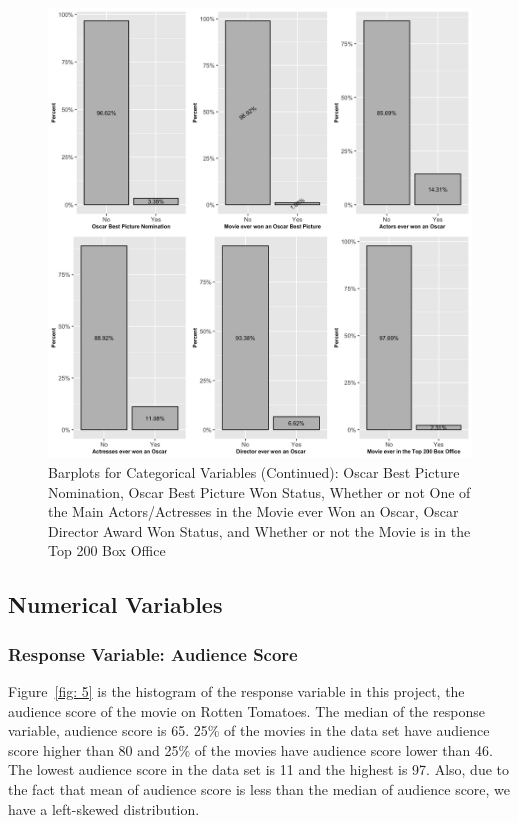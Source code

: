 \documentclass{article}
\begin{document}
\begin{figure}[htbp]
\begin{center}
\includegraphics[scale=0.25]{eda_2.png}
\caption{Barplots for Categorical Variables (Continued): Oscar Best Picture Nomination, Oscar Best Picture Won Status, Whether or not One of the Main Actors/Actresses in the Movie ever Won an Oscar, Oscar Director Award Won Status, and Whether or not the Movie is in the Top 200 Box Office}
\label{fig: 4}
\end{center}
\end{figure}

\subsection{Numerical Variables}
\smallskip
\subsubsection{Response Variable: Audience Score}
Figure~\ref{fig: 5} is the histogram of the response variable in this project, the audience 
score of the movie on Rotten Tomatoes. The median of the response variable, audience
score is 65. 25\% of the movies in the data set have audience score higher than 80 and 
25\% of the movies have audience score lower than 46. The lowest audience score in the 
data set is 11 and the highest is 97. Also, due to the fact that mean of audience score is 
less than the median of audience score, we have a left-skewed distribution.
\end{document}
